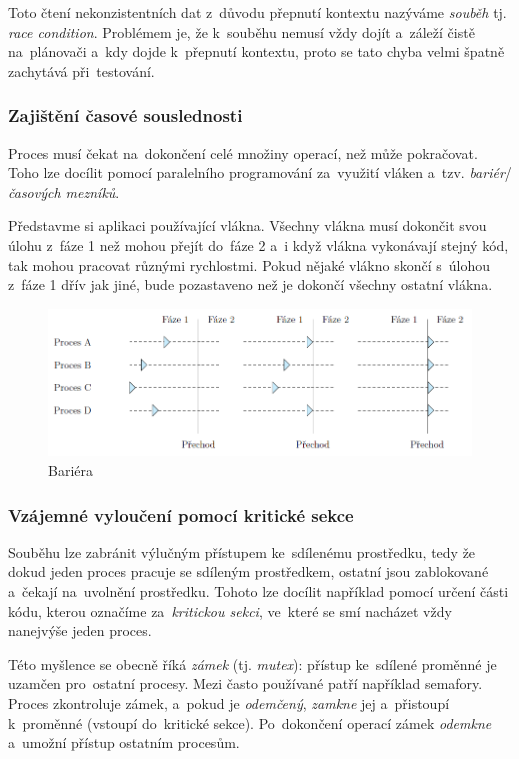 Toto čtení nekonzistentních dat z~důvodu přepnutí kontextu nazýváme \emph{souběh} tj. \emph{race condition}. Problémem je, že k~souběhu nemusí vždy dojít a~záleží čistě na~plánovači a~kdy dojde k~přepnutí kontextu, proto se tato chyba velmi špatně zachytává při~testování.

\subsubsection{Zajištění časové souslednosti}

Proces musí čekat na~dokončení celé množiny operací, než může pokračovat. Toho lze docílit pomocí paralelního programování za~využití vláken a~tzv. \emph{bariér}/\emph{časových mezníků}.

Představme si aplikaci používající vlákna. Všechny vlákna musí dokončit svou úlohu z~fáze 1 než mohou přejít do~fáze 2 a~i když vlákna vykonávají stejný kód, tak mohou pracovat různými rychlostmi. Pokud nějaké vlákno skončí s~úlohou z~fáze 1 dřív jak jiné, bude pozastaveno než je dokončí všechny ostatní vlákna.

\begin{figure}[ht]
	\centering
	\includegraphics[width=\textwidth]{images/proc_barrier.png}
	\caption{Bariéra}
	\label{proc_barrier}
\end{figure}

\subsubsection{Vzájemné vyloučení pomocí kritické sekce}

Souběhu lze zabránit výlučným přístupem ke~sdílenému prostředku, tedy že dokud jeden proces pracuje se sdíleným prostředkem, ostatní jsou zablokované a~čekají na~uvolnění prostředku. Tohoto lze docílit například pomocí určení části kódu, kterou označíme za~\emph{kritickou sekci}, ve~které se smí nacházet vždy nanejvýše jeden proces.

Této myšlence se obecně říká \emph{zámek} (tj. \emph{mutex}): přístup ke~sdílené proměnné je uzamčen pro~ostatní procesy. Mezi často používané patří například semafory. Proces zkontroluje zámek, a~pokud je \emph{odemčený}, \emph{zamkne} jej a~přistoupí k~proměnné (vstoupí do~kritické sekce). Po~dokončení operací zámek \emph{odemkne} a~umožní přístup ostatním procesům.

